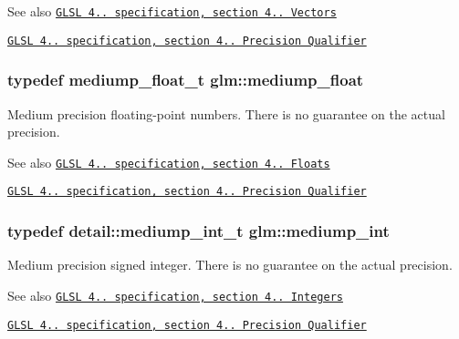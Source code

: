 \begin{DoxySeeAlso}{See also}
\href{http://www.opengl.org/registry/doc/GLSLangSpec.4.20.8.pdf}{\tt G\+L\+SL 4.. specification, section 4.. Vectors} 

\href{http://www.opengl.org/registry/doc/GLSLangSpec.4.20.8.pdf}{\tt G\+L\+SL 4.. specification, section 4.. Precision Qualifier} 
\end{DoxySeeAlso}
\subsubsection[{\texorpdfstring{mediump\+\_\+float}{mediump_float}}]{\setlength{\rightskip}{0pt plus 5cm}typedef mediump\+\_\+float\+\_\+t {\bf glm\+::mediump\+\_\+float}}\hypertarget{group__core__precision_gac785826c039fe6c97c03b37c81c1a68e}{}\label{group__core__precision_gac785826c039fe6c97c03b37c81c1a68e}
Medium precision floating-\/point numbers. There is no guarantee on the actual precision.

\begin{DoxySeeAlso}{See also}
\href{http://www.opengl.org/registry/doc/GLSLangSpec.4.20.8.pdf}{\tt G\+L\+SL 4.. specification, section 4.. Floats} 

\href{http://www.opengl.org/registry/doc/GLSLangSpec.4.20.8.pdf}{\tt G\+L\+SL 4.. specification, section 4.. Precision Qualifier} 
\end{DoxySeeAlso}
\subsubsection[{\texorpdfstring{mediump\+\_\+int}{mediump_int}}]{\setlength{\rightskip}{0pt plus 5cm}typedef detail\+::mediump\+\_\+int\+\_\+t {\bf glm\+::mediump\+\_\+int}}\hypertarget{group__core__precision_ga2a3dcbcd7f4e17663d393a12061ac6ac}{}\label{group__core__precision_ga2a3dcbcd7f4e17663d393a12061ac6ac}
Medium precision signed integer. There is no guarantee on the actual precision.

\begin{DoxySeeAlso}{See also}
\href{http://www.opengl.org/registry/doc/GLSLangSpec.4.20.8.pdf}{\tt G\+L\+SL 4.. specification, section 4.. Integers} 

\href{http://www.opengl.org/registry/doc/GLSLangSpec.4.20.8.pdf}{\tt G\+L\+SL 4.. specification, section 4.. Precision Qualifier} 
\end{DoxySeeAlso}
